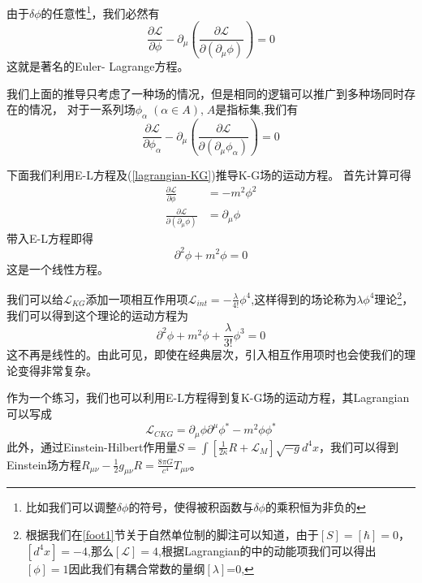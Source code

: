由于$\delta\phi$的任意性\footnote{比如我们可以调整$\delta \phi$的符号，使得被积函数与$\delta \phi$的乘积恒为非负的}，我们必然有
\begin{equation}
\label{ELequation}
\frac{\partial \mathcal{L}}{\partial \phi} -\partial_{\mu}\left(\frac{\partial \mathcal{L}}{\partial (\partial_{\mu}\phi)}\right)=0
\end{equation}
这就是著名的Euler- Lagrange方程。

我们上面的推导只考虑了一种场的情况，但是相同的逻辑可以推广到多种场同时存在的情况，
对于一系列场$\phi_{\alpha}\;\left(\alpha \in A\right)$,$\;A$是指标集,我们有
\begin{equation}
\label{ELequationout}
\frac{\partial \mathcal{L}}{\partial \phi_{\alpha}} -\partial_{\mu}\left(\frac{\partial \mathcal{L}}{\partial (\partial_{\mu}\phi_{\alpha})}\right)=0
\end{equation}

下面我们利用E-L方程及(\ref{lagrangian-KG})推导K-G场的运动方程。
首先计算可得
\begin{equation}
    \begin{aligned}
        \frac{\partial \mathcal{L}}{\partial \phi}&=-m^{2}\phi^{2}\\
        \frac{\partial \mathcal{L}}{\partial (\partial_{\mu}\phi)}&=\partial_{\mu}\phi
    \end{aligned}
\end{equation}
带入E-L方程即得
\begin{equation}
\label{kg-field}
    \partial^{2}\phi+m^{2}\phi=0
\end{equation}
这是一个线性方程。

我们可以给$\mathcal{L}_{KG}$添加一项相互作用项$\mathcal{L}_{int}=-\frac{\lambda}{4!}\phi^{4}$,这样得到的场论称为$\lambda \phi^{4}$理论\footnote{根据我们在\ref{foot1}节关于自然单位制的脚注可以知道，由于$[S]=[\hbar]=0$，$[d^{4}x]=-4$,那么$[\mathcal{L}]=4$,根据Lagrangian的中的动能项我们可以得出$[\phi]=1$因此我们有耦合常数的量纲$[\lambda]$=0,}，我们可以得到这个理论的运动方程为
\begin{equation}
\label{kg-field2}
    \partial^{2}\phi+m^{2}\phi+\frac{\lambda}{3!}\phi^{3}=0
\end{equation}
这不再是线性的。由此可见，即使在经典层次，引入相互作用项时也会使我们的理论变得非常复杂。

作为一个练习，我们也可以利用E-L方程得到复K-G场的运动方程，其Lagrangian可以写成
\begin{equation}
\label{CKG}
    \mathcal{L}_{CKG}=\partial_{\mu}\phi\partial^{\mu}\phi^{*}-m^{2}\phi\phi^{*}
\end{equation}
此外，通过Einstein-Hilbert作用量$S=\int \left[\frac{1}{2\kappa}R+\mathcal{L}_{M}\right]\sqrt{-g}d^{4}x$，我们可以得到Einstein场方程$R_{\mu\nu}-\frac{1}{2}g_{\mu\nu}R=\frac{8\pi G}{c^{4}}T_{\mu\nu}$。

